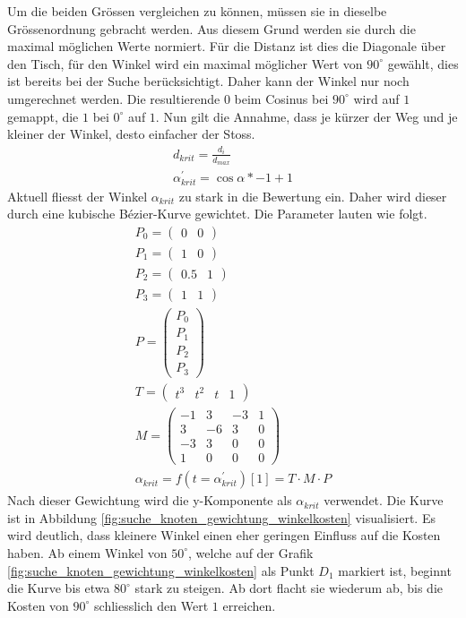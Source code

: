 Um die beiden Grössen vergleichen zu können, müssen sie in dieselbe Grössenordnung gebracht werden. Aus diesem Grund
werden sie durch die maximal möglichen Werte normiert\cite{qucosa:ein_billardroboter:1}. Für die Distanz ist dies die
Diagonale über den Tisch, für den Winkel wird ein maximal möglicher Wert von $90^\circ$ gewählt, dies ist bereits bei
der Suche berücksichtigt. Daher kann der Winkel nur noch umgerechnet werden. Die resultierende $0$ beim Cosinus bei $90^\circ$
wird auf $1$ gemappt, die $1$ bei $0^\circ$ auf $1$. Nun gilt die Annahme, dass je kürzer der Weg und je kleiner der Winkel,
desto einfacher der Stoss.
\begin{align}
    d_{krit} = \frac{d_i}{d_{max}}\\
    \alpha^{'}_{krit} = \cos{\alpha} * -1 + 1
\end{align}
Aktuell fliesst der Winkel $\alpha_{krit}$ zu stark in die Bewertung ein. Daher wird dieser durch eine kubische
Bézier-Kurve\cite{wiki.bezier:1} gewichtet. Die Parameter lauten wie folgt.
\begin{align}
    P_0 = \begin{pmatrix} 0 & 0\end{pmatrix}\\
    P_1 = \begin{pmatrix} 1 & 0\end{pmatrix}\\
    P_2 = \begin{pmatrix} 0.5 & 1\end{pmatrix}\\
    P_3 = \begin{pmatrix} 1 & 1\end{pmatrix}\\
    P = \begin{pmatrix} P_0 \\ P_1 \\ P_2 \\ P_3\end{pmatrix}\\
    T = \begin{pmatrix} t^3 & t^2 & t & 1\end{pmatrix}\\
    M = \begin{pmatrix}
            -1 &  3 & -3 & 1\\
             3 & -6 &  3 & 0\\
            -3 &  3 &  0 & 0\\
             1 &  0 &  0 & 0
        \end{pmatrix}\\
    \alpha_{krit} = f(t = \alpha^{'}_{krit})[1] = T \cdot M \cdot P
\end{align}
Nach dieser Gewichtung wird die y-Komponente als $\alpha_{krit}$ verwendet. Die Kurve ist in Abbildung \ref{fig:suche_knoten_gewichtung_winkelkosten}
visualisiert. Es wird deutlich, dass kleinere Winkel einen eher geringen Einfluss auf die Kosten haben.
Ab einem Winkel von $50^\circ$, welche auf der Grafik \ref{fig:suche_knoten_gewichtung_winkelkosten} als Punkt $D_1$ markiert ist,
beginnt die Kurve bis etwa $80^\circ$ stark zu steigen. Ab dort flacht sie wiederum ab, bis die Kosten von $90^\circ$ schliesslich den Wert
$1$ erreichen.


